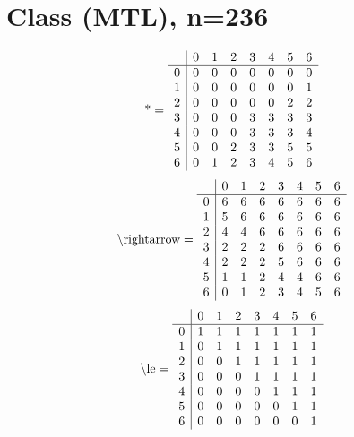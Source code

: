 \documentclass[11pt]{article}
\begin{document}
\section{Class (MTL), n=236}
\[\text{*} = 
\begin{array}{r | r r r r r r r}
 & 0 & 1 & 2 & 3 & 4 & 5 & 6 \\ \hline
0 & 0 & 0 & 0 & 0 & 0 & 0 & 0 \\
1 & 0 & 0 & 0 & 0 & 0 & 0 & 1 \\
2 & 0 & 0 & 0 & 0 & 0 & 2 & 2 \\
3 & 0 & 0 & 0 & 3 & 3 & 3 & 3 \\
4 & 0 & 0 & 0 & 3 & 3 & 3 & 4 \\
5 & 0 & 0 & 2 & 3 & 3 & 5 & 5 \\
6 & 0 & 1 & 2 & 3 & 4 & 5 & 6 \\
\end{array}
\]
\[\text{\textbackslash rightarrow} = 
\begin{array}{r | r r r r r r r}
 & 0 & 1 & 2 & 3 & 4 & 5 & 6 \\ \hline
0 & 6 & 6 & 6 & 6 & 6 & 6 & 6 \\
1 & 5 & 6 & 6 & 6 & 6 & 6 & 6 \\
2 & 4 & 4 & 6 & 6 & 6 & 6 & 6 \\
3 & 2 & 2 & 2 & 6 & 6 & 6 & 6 \\
4 & 2 & 2 & 2 & 5 & 6 & 6 & 6 \\
5 & 1 & 1 & 2 & 4 & 4 & 6 & 6 \\
6 & 0 & 1 & 2 & 3 & 4 & 5 & 6 \\
\end{array}
\]
\[\text{\textbackslash le} = 
\begin{array}{r | r r r r r r r}
 & 0 & 1 & 2 & 3 & 4 & 5 & 6 \\ \hline
0 & 1 & 1 & 1 & 1 & 1 & 1 & 1 \\
1 & 0 & 1 & 1 & 1 & 1 & 1 & 1 \\
2 & 0 & 0 & 1 & 1 & 1 & 1 & 1 \\
3 & 0 & 0 & 0 & 1 & 1 & 1 & 1 \\
4 & 0 & 0 & 0 & 0 & 1 & 1 & 1 \\
5 & 0 & 0 & 0 & 0 & 0 & 1 & 1 \\
6 & 0 & 0 & 0 & 0 & 0 & 0 & 1 \\
\end{array}
\]
\end{document}
